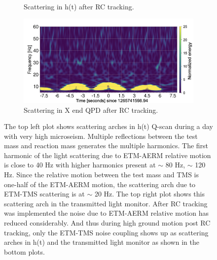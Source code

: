 \documentclass[12pt]{iopart}
\begin{document}
\begin{figure}[h]
\begin{subfigure}[b]{0.45\textwidth}
         \caption{Scattering in h(t) after RC tracking.}
         \label{fig:1265darm}
    \end{subfigure}
    \begin{subfigure}[b]{0.45\textwidth}
        \centering
         \includegraphics[width =\textwidth]{post_r0_transomeg2.png}
         \caption{Scattering in X end QPD after RC tracking.}
         \label{fig:1265trans}
     \end{subfigure}
     
     
    \caption{The top left plot shows scattering arches in h(t) Q-scan during a day with very high microseism. Multiple reflections between the test mass and reaction mass generates the multiple harmonics. The first harmonic of the light scattering due to ETM-AERM relative motion is close to 40 Hz with higher harmonics present at $\sim$ 80 Hz, $\sim$ 120 Hz. Since the relative motion between the test mass and TMS is one-half of the ETM-AERM motion, the scattering arch due to ETM-TMS scattering is at $\sim$ 20 Hz. The top right plot shows this scattering arch in the transmitted light monitor. After RC tracking was implemented the noise due to ETM-AERM relative motion has reduced considerably. And thus during high ground motion post RC tracking, only the ETM-TMS noise coupling shows up as scattering arches in h(t) and the transmitted light monitor as shown in the bottom plots.}
    \label{fig:1262scat}
    
\end{figure}
\end{document}
